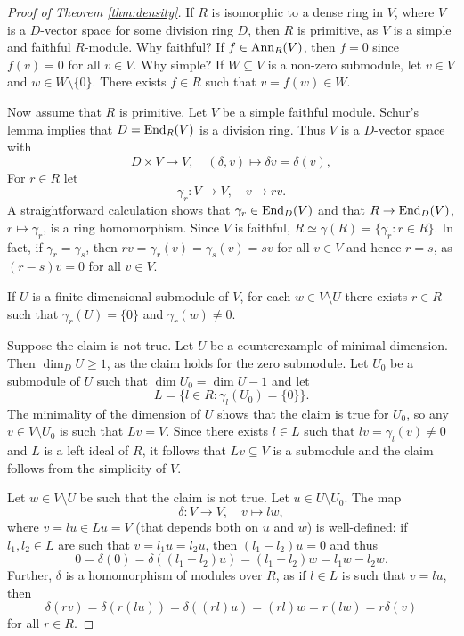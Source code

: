 \begin{proof}[Proof of Theorem \ref{thm:density}]
	If $R$ is isomorphic to a dense ring in $V$, where
	$V$ is a $D$-vector space for some division ring $D$, then $R$
	is primitive, as $V$ is a simple and faithful $R$-module. Why faithful? If 
	$f\in\operatorname{Ann}_R(V)$, then $f=0$ since $f(v)=0$ for all $v\in V$. Why simple? 
	If $W\subseteq V$ is a non-zero submodule, let $v\in V$ and $w\in
	W\setminus\{0\}$. There exists $f\in R$ such that $v=f(w)\in W$. 

	Now assume that $R$ is primitive. Let $V$ be a simple faithful module.
	Schur's lemma implies that $D=\operatorname{End}_R(V)$ is a division ring. Thus $V$ is
	a $D$-vector space with 
	\[
	D\times V\to V,\quad
	(\delta,v)\mapsto \delta v=\delta(v),
	\]
	For $r\in R$ let  
	\[
		\gamma_r\colon V\to V,\quad
		v\mapsto rv.
	\]
	A straightforward calculation shows that $\gamma_r\in\operatorname{End}_D(V)$ and that
    $R\to\operatorname{End}_D(V)$,
	$r\mapsto\gamma_r$, is a ring homomorphism. Since $V$ is faithful,
	$R\simeq\gamma(R)=\{\gamma_r:r\in R\}$. In fact, if $\gamma_r=\gamma_s$, then 
	$rv=\gamma_r(v)=\gamma_s(v)=sv$ for all $v\in V$ and hence $r=s$, as
	$(r-s)v=0$ for all $v\in V$.

	\begin{claim}
		If $U$ is a finite-dimensional submodule of $V$, 
		for each $w\in V\setminus U$ there exists $r\in R$ such that 
		$\gamma_r(U)=\{0\}$ and $\gamma_r(w)\ne0$.
	\end{claim}

	Suppose the claim is not true. Let $U$ be a counterexample of minimal  
	dimension. Then
	$\dim_DU\geq1$, as the claim holds for the zero submodule. Let 
	$U_0$ be a submodule of $U$ such that 
	$\dim U_0=\dim U-1$ and let 
	\[
		L=\{l\in R:\gamma_l(U_0)=\{0\}\}.
	\]
	The minimality of the dimension of $U$ shows that the claim is true for $U_0$, so
	any $v\in V\setminus U_0$ is such that $Lv=V$. Since there exists $l\in
	L$ such that $lv=\gamma_l(v)\ne 0$ and $L$ is a left ideal of $R$, it follows
	that $Lv\subseteq V$ is a submodule and the claim follows from the simplicity of
	$V$.
	
	Let $w\in V\setminus U$ be such that the claim is not true. Let $u\in
	U\setminus U_0$. The map  
	\[
		\delta\colon V\to V,\quad
		v\mapsto lw,
	\]
	where $v=lu\in Lu=V$ (that depends both on $u$ and $w$) 
	is well-defined: if $l_1,l_2\in L$ are such that 
	$v=l_1u=l_2u$, then $(l_1-l_2)u=0$ and thus 
	\[
		0=\delta(0)=\delta((l_1-l_2)u)=(l_1-l_2)w=l_1w-l_2w. 
	\]
	Further, $\delta$ is a homomorphism of modules over $R$, as if 
	$l\in L$ is such that $v=lu$, then 
	\[
		\delta(rv)=\delta(r(lu))=\delta( (rl)u)=(rl)w=r(lw)=r\delta(v)
	\]
	for all $r\in R$.


\end{proof}
